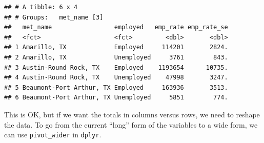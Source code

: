 \documentclass[
]{article}
\newenvironment{Shaded}{\begin{snugshade}}{\end{snugshade}}
\newcommand{\AttributeTok}[1]{\textcolor[rgb]{0.77,0.63,0.00}{#1}}
\newcommand{\DecValTok}[1]{\textcolor[rgb]{0.00,0.00,0.81}{#1}}
\newcommand{\FunctionTok}[1]{\textcolor[rgb]{0.00,0.00,0.00}{#1}}
\newcommand{\NormalTok}[1]{#1}
\newcommand{\SpecialCharTok}[1]{\textcolor[rgb]{0.00,0.00,0.00}{#1}}
\newcommand{\StringTok}[1]{\textcolor[rgb]{0.31,0.60,0.02}{#1}}
\begin{document}
\begin{Shaded}
\end{Shaded}

\begin{verbatim}
## # A tibble: 6 x 4
## # Groups:   met_name [3]
##   met_name                 employed   emp_rate emp_rate_se
##   <fct>                    <fct>         <dbl>       <dbl>
## 1 Amarillo, TX             Employed     114201       2824.
## 2 Amarillo, TX             Unemployed     3761        843.
## 3 Austin-Round Rock, TX    Employed    1193654      10735.
## 4 Austin-Round Rock, TX    Unemployed    47998       3247.
## 5 Beaumont-Port Arthur, TX Employed     163936       3513.
## 6 Beaumont-Port Arthur, TX Unemployed     5851        774.
\end{verbatim}

This is OK, but if we want the totals in columns versus rows, we need to reshape the data. To go from the current ``long'' form of the variables to a wide form, we can use \texttt{pivot\_wider} in \texttt{dplyr}.
\end{document}
